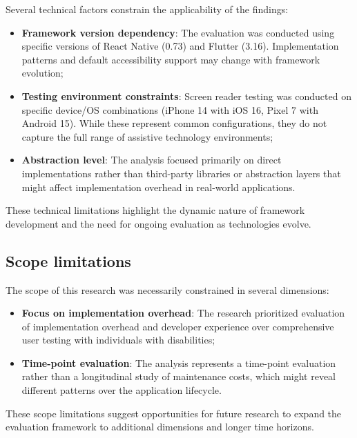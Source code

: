 Several technical factors constrain the applicability of the findings:

\begin{itemize}
    \item \textbf{Framework version dependency}: The evaluation was conducted using specific versions of React Native (0.73) and Flutter (3.16). Implementation patterns and default accessibility support may change with framework evolution;

    \item \textbf{Testing environment constraints}: Screen reader testing was conducted on specific device/OS combinations (iPhone 14 with iOS 16, Pixel 7 with Android 15). While these represent common configurations, they do not capture the full range of assistive technology environments;

    \item \textbf{Abstraction level}: The analysis focused primarily on direct implementations rather than third-party libraries or abstraction layers that might affect implementation overhead in real-world applications.
\end{itemize}

These technical limitations highlight the dynamic nature of framework development and the need for ongoing evaluation as technologies evolve.

\subsection{Scope limitations}
\label{subsec:limitations-scope}

The scope of this research was necessarily constrained in several dimensions:

\begin{itemize}
    \item \textbf{Focus on implementation overhead}: The research prioritized evaluation of implementation overhead and developer experience over comprehensive user testing with individuals with disabilities;

    \item \textbf{Time-point evaluation}: The analysis represents a time-point evaluation rather than a longitudinal study of maintenance costs, which might reveal different patterns over the application lifecycle.
\end{itemize}

These scope limitations suggest opportunities for future research to expand the evaluation framework to additional dimensions and longer time horizons.

